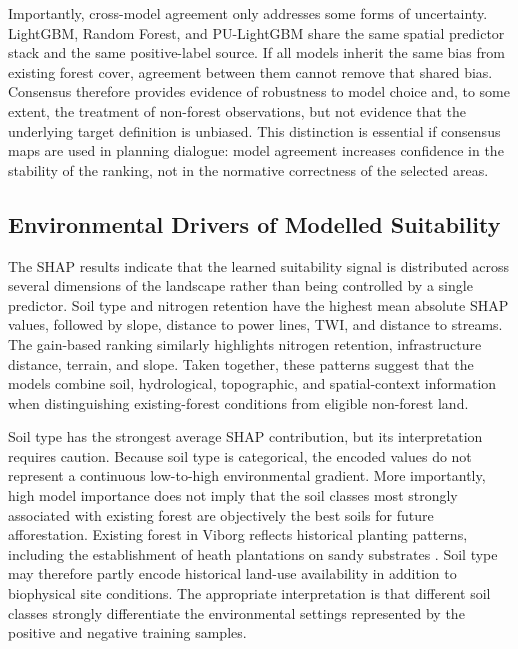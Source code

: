 \documentclass[land,article,submit,moreauthors]{Definitions/mdpi}
\begin{document}
Importantly, cross-model agreement only addresses some forms of uncertainty. LightGBM, Random Forest, and PU-LightGBM share the same spatial predictor stack and the same positive-label source. If all models inherit the same bias from existing forest cover, agreement between them cannot remove that shared bias. Consensus therefore provides evidence of robustness to model choice and, to some extent, the treatment of non-forest observations, but not evidence that the underlying target definition is unbiased. This distinction is essential if consensus maps are used in planning dialogue: model agreement increases confidence in the stability of the ranking, not in the normative correctness of the selected areas.

\subsection{Environmental Drivers of Modelled Suitability}
\label{sec:discussion-drivers}

The SHAP results indicate that the learned suitability signal is distributed across several dimensions of the landscape rather than being controlled by a single predictor. Soil type and nitrogen retention have the highest mean absolute SHAP values, followed by slope, distance to power lines, TWI, and distance to streams. The gain-based ranking similarly highlights nitrogen retention, infrastructure distance, terrain, and slope. Taken together, these patterns suggest that the models combine soil, hydrological, topographic, and spatial-context information when distinguishing existing-forest conditions from eligible non-forest land.

Soil type has the strongest average SHAP contribution, but its interpretation requires caution. Because soil type is categorical, the encoded values do not represent a continuous low-to-high environmental gradient. More importantly, high model importance does not imply that the soil classes most strongly associated with existing forest are objectively the best soils for future afforestation. Existing forest in Viborg reflects historical planting patterns, including the establishment of heath plantations on sandy substrates \citep{sorensen2024}. Soil type may therefore partly encode historical land-use availability in addition to biophysical site conditions. The appropriate interpretation is that different soil classes strongly differentiate the environmental settings represented by the positive and negative training samples.
\end{document}
